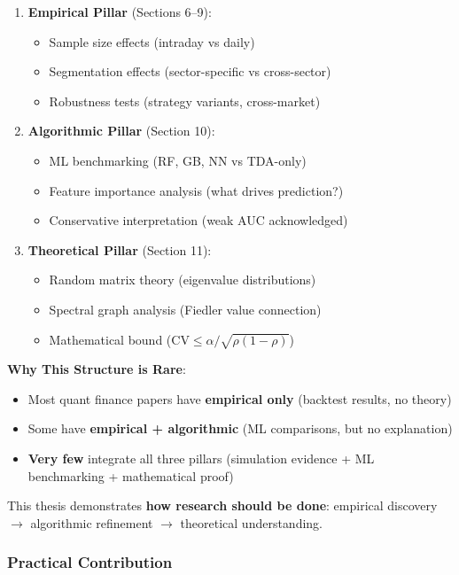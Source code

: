 \begin{enumerate}
\item \textbf{Empirical Pillar} (Sections 6--9):
   \begin{itemize}
   \item Sample size effects (intraday vs daily)
   \item Segmentation effects (sector-specific vs cross-sector)
   \item Robustness tests (strategy variants, cross-market)
   \end{itemize}

\item \textbf{Algorithmic Pillar} (Section 10):
   \begin{itemize}
   \item ML benchmarking (RF, GB, NN vs TDA-only)
   \item Feature importance analysis (what drives prediction?)
   \item Conservative interpretation (weak AUC acknowledged)
   \end{itemize}

\item \textbf{Theoretical Pillar} (Section 11):
   \begin{itemize}
   \item Random matrix theory (eigenvalue distributions)
   \item Spectral graph analysis (Fiedler value connection)
   \item Mathematical bound ($\text{CV} \leq \alpha/\sqrt{\rho(1-\rho)}$)
   \end{itemize}
\end{enumerate}

\textbf{Why This Structure is Rare}:
\begin{itemize}
\item Most quant finance papers have \textbf{empirical only} (backtest results, no theory)
\item Some have \textbf{empirical + algorithmic} (ML comparisons, but no explanation)
\item \textbf{Very few} integrate all three pillars (simulation evidence + ML benchmarking + mathematical proof)
\end{itemize}

This thesis demonstrates \textbf{how research should be done}: empirical discovery $\rightarrow$ algorithmic refinement $\rightarrow$ theoretical understanding.

\subsubsection{Practical Contribution}

